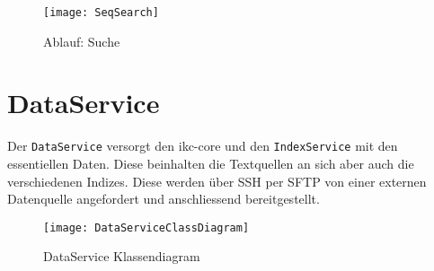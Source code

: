    \begin{figure}[H]
    \centering
    \texttt{[image: SeqSearch]}
    \caption{Ablauf: Suche}
    \label{fig:seqsearch}
    \end{figure}



\section{DataService}


Der \texttt{DataService} versorgt den \gls{ikc-core} und den \texttt{IndexService} mit den essentiellen Daten. Diese beinhalten die Textquellen an sich aber auch die verschiedenen Indizes. Diese werden über \gls{SSH} per \gls{SFTP} von einer externen Datenquelle angefordert und anschliessend bereitgestellt. 

    \begin{figure}[H]
    \centering
    \texttt{[image: DataServiceClassDiagram]}
    \caption{DataService Klassendiagram}
    \label{fig:dataserviceClassDiagram}
    \end{figure}



